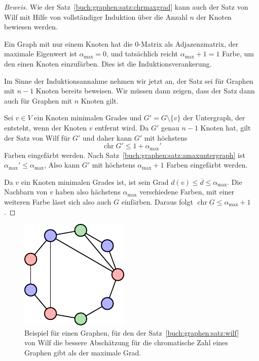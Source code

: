 \begin{proof}[Beweis]
Wie der Satz~\ref{buch:graphen:satz:chrmaxgrad} kann auch der Satz von Wilf
mit Hilfe von vollständiger Induktion über die Anzahl $n$ der Knoten
bewiesen werden.

Ein Graph mit nur einem Knoten hat die $0$-Matrix als Adjazenzmatrix,
der maximale Eigenwert ist $\alpha_{\text{max}}=0$, und tatsächlich reicht
$\alpha_{\text{max}}+1=1$ Farbe, um den einen Knoten einzufärben.
Dies ist die Induktionsverankerung.

Im Sinne der Induktionsannahme 
nehmen wir jetzt an, der Satz sei für Graphen mit $n-1$ Knoten bereits
beweisen.
Wir müssen dann zeigen, dass der Satz dann auch für Graphen mit $n$ Knoten
gilt.

Sei $v\in V$ ein Knoten minimalen Grades und $G'=G\setminus\{v\}$ der
Untergraph, der entsteht, wenn der Knoten $v$ entfernt wird.
Da $G'$ genau $n-1$ Knoten hat, gilt der Satz von Wilf für $G'$
und daher kann $G'$ mit höchstens
\[
\operatorname{chr}G' \le 1 + \alpha_{\text{max}}'
\]
Farben eingefärbt werden.
Nach Satz~\ref{buch:graphen:satz:amaxuntergraph} ist
$\alpha_{\text{max}}'\le \alpha_{\text{max}}$,
Also kann $G'$ mit höchstens $\alpha_{\text{max}}+1$ Farben eingefärbt werden.

Da $v$ ein Knoten minimalen Grades ist, ist sein Grad
$d(v)\le \overline{d}\le \alpha_{\text{max}}$.
Die Nachbarn von $v$ haben also hächstens $\alpha_{\text{max}}$ verschiedene
Farben, mit einer weiteren Farbe lässt sich also auch $G$ einfärben.
Daraus folgt $\operatorname{chr}G\le \alpha_{\text{max}}+1$.
\end{proof}

\begin{figure}
\centering
\includegraphics{chapters/70-graphen/images/nine.pdf}
\caption{Beispiel für einen Graphen, für den der
Satz~\ref{buch:graphen:satz:wilf} von Wilf die bessere
Abschätzung für die chromatische Zahl eines Graphen gibt als der
maximale Grad.
\label{buch:graphen:fig:wilfexample}}
\end{figure}

